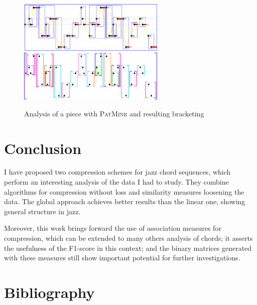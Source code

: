 \documentclass[a4paper,10pt]{article}
\begin{document}
\begin{figure}[h]
\centering
\includegraphics[width=7cm]{images/patminr1.jpg}\hspace{1cm}
\includegraphics[width=7cm]{images/patminr2.jpg}
\caption{Analysis of a piece with \textsc{PatMinr} and resulting bracketing\label{bracket}}
\end{figure}


\section{Conclusion}

I have proposed two compression schemes for jazz chord sequences, which perform an interesting analysis of the data I had to study. They combine algorithms for compression without loss and similarity measures loosening the data. The global approach achieves better results than the linear one, showing general structure in jazz.

Moreover, this work brings forward the use of association measures for compression, which can be extended to many others analysis of chords; it asserts the usefulness of the F1-score in this context; and the binary matrices generated with these measures still show important potential for further investigations.

\newpage
\section{Bibliography}



\end{document}
